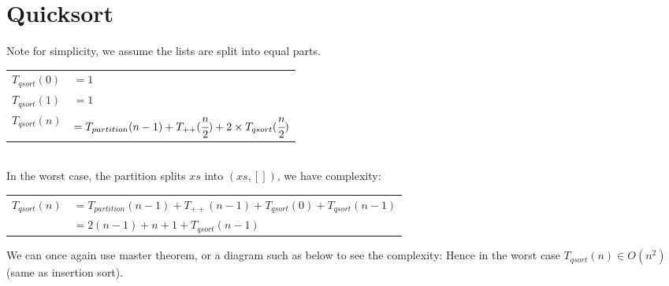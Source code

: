 \documentclass{report}
\begin{document}
\section*{Quicksort}
Note for simplicity, we assume the lists are split into equal parts.
\\ \begin{tabular}{l l }
	$T_{qsort}(0) $ & $= 1$                                                                            \\
	$T_{qsort}(1) $ & $= 1$                                                                            \\
	$T_{qsort}(n) $ & $= T_{partition}(n-1) + T_{++}(\cfrac{n}{2}) + 2 \times T_{qsort}(\cfrac{n}{2})$ \\
\end{tabular}
\\In the worst case, the partition splits $xs$ into $(xs, [])$, we have complexity:
\\ \begin{tabular}{l l }
	$T_{qsort}(n) $ & $= T_{partition}(n-1) + T_{++}(n-1) + T_{qsort}(0) + T_{qsort}(n-1)$ \\
	                & $= 2(n-1) + n + 1 + T_{qsort}(n-1)$                                  \\
\end{tabular}
We can once again use master theorem, or a diagram such as below to see the complexity:
Hence in the worst case $T_{qsort}(n) \in O(n^2)$ (same as insertion sort).
\end{document}

